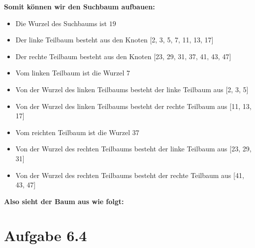 \documentclass[a4paper]{article}
\begin{document}
\textbf{Somit können wir den Suchbaum aufbauen:}

\begin{itemize}
    \item Die Wurzel des Suchbaums ist $19$
    \item Der linke Teilbaum besteht aus den Knoten [2, 3, 5, 7, 11, 13, 17]
    \item Der rechte Teilbaum besteht aus den Knoten [23, 29, 31, 37, 41, 43, 47]
    \item Vom linken Teilbaum ist die Wurzel $7$
    \item Von der Wurzel des linken Teilbaums besteht der linke Teilbaum aus [2, 3, 5]
    \item Von der Wurzel des linken Teilbaums besteht der rechte Teilbaum aus [11, 13, 17]
    \item Vom reichten Teilbaum ist die Wurzel $37$
    \item Von der Wurzel des rechten Teilbaums besteht der linke Teilbaum aus [23, 29, 31]
    \item Von der Wurzel des rechten Teilbaums besteht der rechte Teilbaum aus [41, 43, 47]\\
\end{itemize}

\textbf{Also sieht der Baum aus wie folgt:}\\


\break

\section*{Aufgabe 6.4}
\end{document}
